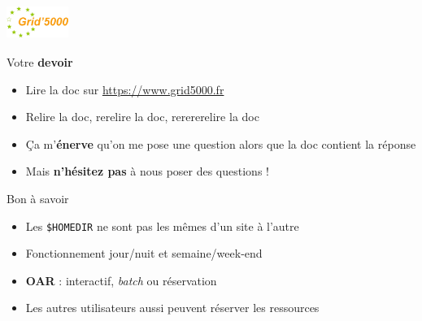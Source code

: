 \documentclass[10pt]{beamer}
\begin{document}

\begin{frame}[label=tme]
  \frametitle{\includegraphics[height=1cm]{grid5000_logo.png}}

  \begin{alertblock}{Votre \textbf{devoir}}
    \begin{itemize}
    \item Lire la doc sur \url{https://www.grid5000.fr}
    \item Relire la doc, rerelire la doc, rerererelire la doc
    \item Ça m'\textbf{énerve} qu'on me pose une question alors que la doc contient la réponse
    \item Mais \textbf{n'hésitez pas} à nous poser des questions !
    \end{itemize}
  \end{alertblock}
  
  \medskip
  
  \begin{exampleblock}{Bon à savoir}
    \begin{itemize}
    \item Les \texttt{\$HOMEDIR} ne sont pas les mêmes d'un site à l'autre
    \item Fonctionnement jour/nuit et semaine/week-end
    \item \textbf{OAR} : interactif, \emph{batch} ou réservation
    \item Les autres utilisateurs aussi peuvent réserver les ressources
    \end{itemize}
  \end{exampleblock}

\end{frame}

\end{document}
